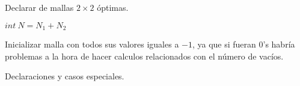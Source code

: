 \documentclass[]{article}
\newlength{\espacioVert}
\begin{document}
\setcounter{algocf}{0}


\begin{algorithm}[H]
	
	\vspace{\espacioVert}		
	
	Declarar de mallas $2\times2$ óptimas.
	
	$int\ N = N_1 + N_2$ 
	
	\vspace{\espacioVert}	
	
	
	\vspace{\espacioVert}
	
	
	\vspace{\espacioVert}
	
	Inicializar malla con todos sus valores iguales a $-1$, ya que si fueran $0$'s habría problemas a la hora de hacer calculos 
	relacionados con el número de vacíos.
	
	\vspace{\espacioVert}	

	\caption{Declaraciones y casos especiales.\label{algo2}}

\end{algorithm}


\end{document}
